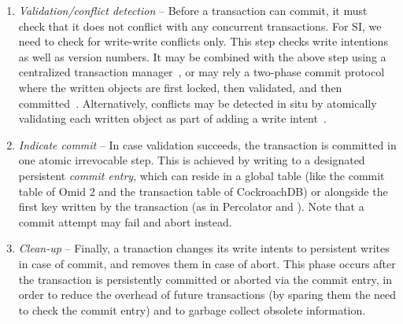 \begin{enumerate}
   \item \emph{Validation/conflict detection} -- Before a transaction can commit, it must check that it does not conflict with any 
  concurrent transactions.  For SI, we need to check for write-write conflicts only. 
  This step checks write intentions as well as version numbers. It may be combined  with the above step using a centralized 
  transaction manager~\cite{OmidICDE2014,tephra,omid-blog}, or may rely a two-phase commit protocol where the written objects are first 
  locked, then validated, and then committed~\cite{Percolator2010}. 
 Alternatively, conflicts may be detected in situ by atomically validating each written object as part of adding a write  intent~\cite{cockroach}.
  \item \emph{Indicate commit} --  In case validation succeeds, the transaction is committed 
  in one atomic irrevocable  step. This is achieved by writing to a designated persistent \emph{commit entry}, 
  which can reside in a global table (like the commit table of 
  Omid 2 and the transaction table of CockroachDB) or alongside the first  key written by 
  the transaction (as in Percolator and \sys).  Note that a commit attempt may fail and abort instead. 
  \item \emph{Clean-up} -- Finally, a tranaction changes its write intents to
  persistent writes in case of commit, and removes them in case of abort. This
  phase occurs after the transaction is persistently committed or aborted via the commit entry, in
  order to reduce the overhead of future transactions (by sparing them the need to check the commit entry)
  and to garbage collect   obsolete information. 
\end{enumerate}

 